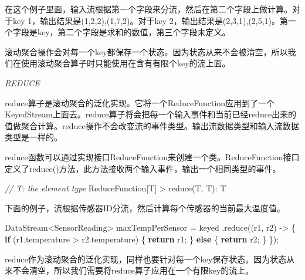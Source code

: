 \documentclass[cn,11pt,chinese]{elegantbook}
\newenvironment{Shaded}{}{}
\newcommand{\CommentTok}[1]{\textcolor[rgb]{0.38,0.63,0.69}{\textit{#1}}}
\newcommand{\FunctionTok}[1]{\textcolor[rgb]{0.02,0.16,0.49}{#1}}
\newcommand{\KeywordTok}[1]{\textcolor[rgb]{0.00,0.44,0.13}{\textbf{#1}}}
\newcommand{\NormalTok}[1]{#1}
\renewenvironment{quote}{\begin{customblockquote}\list{}{\rightmargin=0em\leftmargin=0em}%
\item\relax\color{blockquote-text}\ignorespaces}{\unskip\unskip\endlist\end{customblockquote}}
\begin{document}
在这个例子里面，输入流根据第一个字段来分流，然后在第二个字段上做计算。对于key
1，输出结果是(1,2,2),(1,7,2)。对于key
2，输出结果是(2,3,1),(2,5,1)。第一个字段是key，第二个字段是求和的数值，第三个字段未定义。

\begin{quote}
滚动聚合操作会对每一个key都保存一个状态。因为状态从来不会被清空，所以我们在使用滚动聚合算子时只能使用在含有有限个key的流上面。
\end{quote}

\emph{REDUCE}

reduce算子是滚动聚合的泛化实现。它将一个ReduceFunction应用到了一个KeyedStream上面去。reduce算子将会把每一个输入事件和当前已经reduce出来的值做聚合计算。reduce操作不会改变流的事件类型。输出流数据类型和输入流数据类型是一样的。

reduce函数可以通过实现接口ReduceFunction来创建一个类。ReduceFunction接口定义了reduce()方法，此方法接收两个输入事件，输出一个相同类型的事件。

\begin{Shaded}
\begin{Highlighting}[]
\CommentTok{// T: the element type}
\NormalTok{ReduceFunction[T]}
\NormalTok{    \textgreater{} }\FunctionTok{reduce}\NormalTok{(T, T): T}
\end{Highlighting}
\end{Shaded}

下面的例子，流根据传感器ID分流，然后计算每个传感器的当前最大温度值。

\begin{Shaded}
\begin{Highlighting}[]
\NormalTok{DataStream\textless{}SensorReading\textgreater{} maxTempPerSensor = keyed}
\NormalTok{        .}\FunctionTok{reduce}\NormalTok{((r1, r2) {-}\textgreater{} \{}
            \KeywordTok{if}\NormalTok{ (r1.}\FunctionTok{temperature}\NormalTok{ \textgreater{} r2.}\FunctionTok{temperature}\NormalTok{) \{}
                \KeywordTok{return}\NormalTok{ r1;}
\NormalTok{            \} }\KeywordTok{else}\NormalTok{ \{}
                \KeywordTok{return}\NormalTok{ r2;}
\NormalTok{            \}}
\NormalTok{        \});}
\end{Highlighting}
\end{Shaded}

\begin{quote}
reduce作为滚动聚合的泛化实现，同样也要针对每一个key保存状态。因为状态从来不会清空，所以我们需要将reduce算子应用在一个有限key的流上。
\end{quote}
\end{document}
